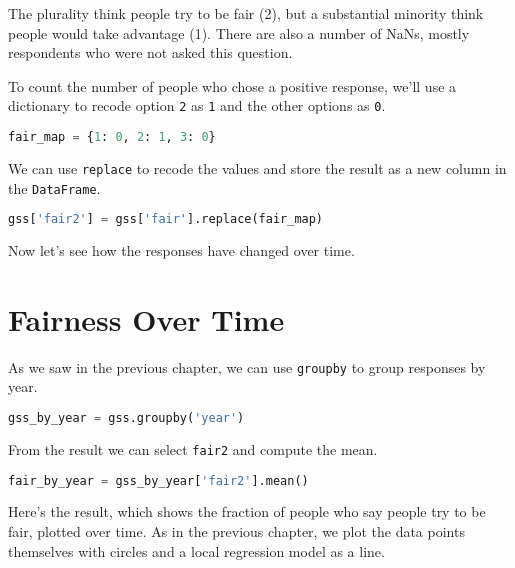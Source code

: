 The plurality think people try to be fair (2), but a substantial
minority think people would take advantage (1). There are also a number
of NaNs, mostly respondents who were not asked this question.

\pagebreak

To count the number of people who chose a positive response, we'll use a
dictionary to recode option \passthrough{\lstinline!2!} as
\passthrough{\lstinline!1!} and the other options as
\passthrough{\lstinline!0!}.

\begin{lstlisting}[language=Python,style=source]
fair_map = {1: 0, 2: 1, 3: 0}
\end{lstlisting}

We can use \passthrough{\lstinline!replace!} to recode the values and
store the result as a new column in the
\passthrough{\lstinline!DataFrame!}.

\begin{lstlisting}[language=Python,style=source]
gss['fair2'] = gss['fair'].replace(fair_map)
\end{lstlisting}

Now let's see how the responses have changed over time.

\section{Fairness Over Time}\label{fairness-over-time}

As we saw in the previous chapter, we can use
\passthrough{\lstinline!groupby!} to group responses by year.

\begin{lstlisting}[language=Python,style=source]
gss_by_year = gss.groupby('year')
\end{lstlisting}

From the result we can select \passthrough{\lstinline!fair2!} and
compute the mean.

\begin{lstlisting}[language=Python,style=source]
fair_by_year = gss_by_year['fair2'].mean()
\end{lstlisting}

Here's the result, which shows the fraction of people who say people try
to be fair, plotted over time. As in the previous chapter, we plot the
data points themselves with circles and a local regression model as a
line.

